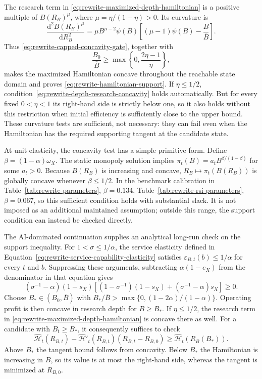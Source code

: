 The research term in \eqref{eq:rewrite-maximized-depth-hamiltonian} is a
positive multiple of $B(R_B)^\mu$, where $\mu=\eta/(1-\eta)>0$. Its curvature is
\begin{equation}
 \frac{\mathrm d^2 B(R_B)^\mu}{\mathrm dR_B^2}
 =\mu B^{\mu-2}\psi(B)
 \left[(\mu-1)\psi(B)-\frac B{\overline B}\right].
 \label{eq:rewrite-depth-research-curvature}
\end{equation}
Thus \eqref{eq:rewrite-capped-concavity-gate}, together with
\begin{equation}
 \frac{B_0}{\overline B}\geq
 \max\left\{0,\frac{2\eta-1}{\eta}\right\},
 \label{eq:rewrite-depth-research-concavity}
\end{equation}
makes the maximized Hamiltonian concave throughout the reachable state
domain and proves \eqref{eq:rewrite-hamiltonian-support}.
If $\eta\leq1/2$, condition~\eqref{eq:rewrite-depth-research-concavity}
holds automatically. But for every fixed
$0<\eta<1$ its right-hand side is strictly below one, so it also holds
without this restriction when initial efficiency is sufficiently close to
the upper bound. These curvature tests are sufficient, not necessary: they
can fail even when the Hamiltonian has the required supporting tangent at
the candidate state.

At unit elasticity, the concavity test has a simple primitive form. Define
$\beta=(1-\alpha)\omega_X$. The static monopoly solution implies
$\pi_t(B)=a_tB^{\beta/(1-\beta)}$ for some $a_t>0$. Because $B(R_B)$ is
increasing and concave, $R_B\mapsto\pi_t(B(R_B))$ is globally concave whenever
$\beta\leq1/2$. In the benchmark calibration in
\ifshowlegacysimulations
Table~\ref{tab:rewrite-parameters}, $\beta=0.134$,
\else
Table~\ref{tab:rewrite-rsi-parameters}, $\beta=0.067$,
\fi
so this sufficient condition
holds with substantial slack. It is not imposed as an additional maintained
assumption; outside this range, the support condition can instead be checked
directly.

The AI-dominated continuation supplies an analytical long-run check on the
support inequality. For $1<\sigma\leq1/\alpha$, the service elasticity defined
in Equation~\eqref{eq:rewrite-service-capability-elasticity} satisfies
$\varepsilon_{B,t}(b)\leq1/\alpha$ for every $t$ and $b$. Suppressing these
arguments, subtracting $\alpha(1-e_X)$ from the denominator in that equation
gives
\[
 (\sigma^{-1}-\alpha)(1-s_X)
 \left[(1-\sigma^{-1})(1-s_X)+(\sigma^{-1}-\alpha)s_X\right]\geq0.
\]
Choose $B_*\in(B_0,\overline B)$ with
$B_*/\overline B>\max\{0,(1-2\alpha)/(1-\alpha)\}$.
Operating profit is then concave in research depth for $B\geq B_*$.
If $\eta\leq1/2$, the research term in
\eqref{eq:rewrite-maximized-depth-hamiltonian} is concave there as well.
For a candidate with $B_t\geq B_*$, it consequently suffices to check
\begin{equation}
 \widehat{\mathcal H}_t(R_{B,t})
 -\widehat{\mathcal H}'_t(R_{B,t})(R_{B,t}-R_{B,0})
 \geq\widehat{\mathcal H}_t(R_B(B_*)).
 \label{eq:rewrite-support-terminal-bound}
\end{equation}
Above $B_*$ the tangent bound follows from concavity. Below $B_*$ the
Hamiltonian is increasing in $B$, so its value is at most the right-hand
side, whereas the tangent is minimized at $R_{B,0}$.


